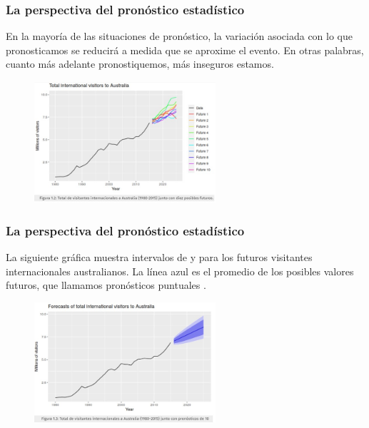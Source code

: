 \documentclass[10pt]{beamer}
\begin{document}
\begin{frame}
\frametitle{La perspectiva del pronóstico estadístico}



En la mayoría de las situaciones de pronóstico, la variación asociada con lo que pronosticamos se reducirá a medida que se aproxime el evento. En otras palabras, cuanto más adelante pronostiquemos, más inseguros estamos.

\vspace{3mm}

\begin{figure}
\begin{center}
    \includegraphics[width=0.6\textwidth]{Imagen10.JPG}
\end{center}
\end{figure}


\end{frame}





\begin{frame}
\frametitle{La perspectiva del pronóstico estadístico}



La siguiente gráfica muestra intervalos de  y  para los futuros visitantes internacionales australianos. La línea azul es el promedio de los posibles valores futuros, que llamamos pronósticos puntuales .
\vspace{3mm}

\begin{figure}
\begin{center}
    \includegraphics[width=0.6\textwidth]{Imagen11.JPG}
\end{center}
\end{figure}


\end{frame}
\end{document}
